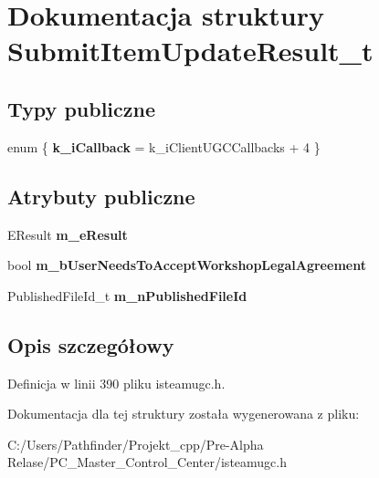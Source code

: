 \hypertarget{struct_submit_item_update_result__t}{}\section{Dokumentacja struktury Submit\+Item\+Update\+Result\+\_\+t}
\label{struct_submit_item_update_result__t}
\subsection*{Typy publiczne}
\begin{DoxyCompactItemize}
\item 
\mbox{\label{struct_submit_item_update_result__t_a483919b936c558cd780acaa84d11a0dd}} 
enum \{ {\bfseries k\+\_\+i\+Callback} = k\+\_\+i\+Client\+U\+G\+C\+Callbacks + 4
 \}
\end{DoxyCompactItemize}
\subsection*{Atrybuty publiczne}
\begin{DoxyCompactItemize}
\item 
\mbox{\label{struct_submit_item_update_result__t_afc97b6791310f59808be81c10fe3cabd}} 
E\+Result {\bfseries m\+\_\+e\+Result}
\item 
\mbox{\label{struct_submit_item_update_result__t_a610c8809e2d2c0a6a4f8450a8c4ffc95}} 
bool {\bfseries m\+\_\+b\+User\+Needs\+To\+Accept\+Workshop\+Legal\+Agreement}
\item 
\mbox{\label{struct_submit_item_update_result__t_adbaeffdeebe394973ffb10ecd58033e8}} 
Published\+File\+Id\+\_\+t {\bfseries m\+\_\+n\+Published\+File\+Id}
\end{DoxyCompactItemize}


\subsection{Opis szczegółowy}


Definicja w linii 390 pliku isteamugc.\+h.



Dokumentacja dla tej struktury została wygenerowana z pliku\+:\begin{DoxyCompactItemize}
\item 
C\+:/\+Users/\+Pathfinder/\+Projekt\+\_\+cpp/\+Pre-\/\+Alpha Relase/\+P\+C\+\_\+\+Master\+\_\+\+Control\+\_\+\+Center/isteamugc.\+h\end{DoxyCompactItemize}
